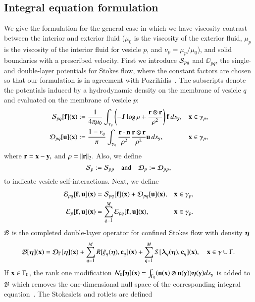 \subsection{Integral equation formulation}
We give the formulation for the general case in which we have viscosity
contrast between the interior and exterior fluid ($\mu_0$ is the
viscosity of the exterior fluid, $\mu_p$ is the viscosity of the
interior fluid for vesicle $p$, and $\nu_p = \mu_p/\mu_0$), and solid
boundaries with a prescribed velocity.  First we introduce ${\mathcal{S}}_{pq}$
and $\DD_{pq}$, the single- and double-layer potentials for Stokes flow,
where the constant factors are chosen so that our formulation is in
agreement with Pozrikidis~\cite[equation 2.2]{pozrikidis2001b}. The
subscripts denote the potentials induced by a hydrodynamic density on
the membrane of vesicle $q$ and evaluated on the membrane of vesicle
$p$:
\begin{align*}
  {\mathcal{S}}_{pq}[{\mathbf{f}}]({\mathbf{x}}) &:= \frac{1}{4\pi\mu_{0}}\int_{\gamma_{q}}\left(
    -\boldsymbol{I} \log \rho
  + \frac{{\mathbf{r}} \otimes {\mathbf{r}}}{\rho^{2}} \right){\mathbf{f}}\, ds_{{\mathbf{y}}},
  && {\mathbf{x}} \in \gamma_{p}, \\
  {\mathcal{D}}_{pq}[{\mathbf{u}}]({\mathbf{x}}) &:= \frac{1-\nu_{q}}{\pi}\int_{\gamma_{q}}
    \frac{{\mathbf{r}} \cdot {\mathbf{n}}}{\rho^{2}}\frac{{\mathbf{r}} \otimes {\mathbf{r}}}{\rho^{2}}{\mathbf{u}}\,
  ds_{{\mathbf{y}}}, && {\mathbf{x}} \in \gamma_{p},
\end{align*}
where ${\mathbf{r}} = {\mathbf{x}} - {\mathbf{y}},$ and $\rho = \|{\mathbf{r}}\|_{2}$.      
Also, we define
\[{\mathcal{S}}_{p} := {\mathcal{S}}_{pp}\quad\mbox{and}\quad {\mathcal{D}}_{p} := {\mathcal{D}}_{pp},\]
to indicate vesicle self-interactions.  Next, we define
\begin{align*}
  {\mathcal{E}}_{pq}[{\mathbf{f}},{\mathbf{u}}]({\mathbf{x}}) &= {\mathcal{S}}_{pq}[{\mathbf{f}}]({\mathbf{x}}) + {\mathcal{D}}_{pq}[{\mathbf{u}}]({\mathbf{x}}), && {\mathbf{x}} \in \gamma_{p}, \\
  {\mathcal{E}}_{p}[{\mathbf{f}},{\mathbf{u}}]({\mathbf{x}}) &= \sum_{q=1}^{M} {\mathcal{E}}_{pq}[{\mathbf{f}},{\mathbf{u}}]({\mathbf{x}}), && {\mathbf{x}} \in \gamma_{p}.
\end{align*}
${\mathcal{B}}$ is the completed double-layer operator for confined
Stokes flow with density ${\boldsymbol\eta}$
\begin{align*}
  {\mathcal{B}}[{\boldsymbol\eta}]({\mathbf{x}}) = {\mathcal{D}}_{\Gamma}[{\boldsymbol\eta}]({\mathbf{x}}) + 
    \sum_{q=1}^{M}R[\xi_{q}({\boldsymbol\eta}),{\mathbf{c}}_{q}]({\mathbf{x}}) + 
    \sum_{q=1}^{M}S[{\boldsymbol\lambda}_{q}({\boldsymbol\eta}),{\mathbf{c}}_{q}]({\mathbf{x}}), 
    \quad {\mathbf{x}} \in \gamma \cup \Gamma.
\end{align*}
If ${\mathbf{x}} \in \Gamma_{0}$, the rank one modification
$\mathcal{N}_{0}[{\boldsymbol\eta}]({\mathbf{x}}) = \int_{\Gamma_{0}}({\mathbf{n}}({\mathbf{x}}) \otimes
{\mathbf{n}}({\mathbf{y}})) {\boldsymbol\eta}({\mathbf{y}})ds_{{\mathbf{y}}}$ is added to ${\mathcal{B}}$ which removes the
one-dimensional null space of the corresponding integral
equation~\cite{pozrikidis1992}.  The Stokeslets and rotlets are defined
